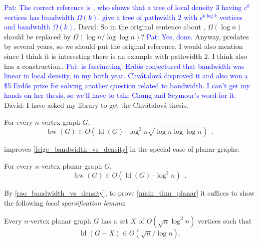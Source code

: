 \documentclass{patmorin}
\newcommand{\david}[1]{{\color{orange} David: #1}}
\newcommand{\pat}[1]{\textcolor{Blue}{Pat: #1}}
\newcommand{\defin}[1]{\emph{\textcolor{brightmaroon}{#1}}}
\DeclareMathOperator{\bw}{bw}
\DeclareMathOperator{\ld}{ld}
\begin{document}
\pat{The correct reference is \citet{chvatalova:on}, who shows that a tree of local density $3$ having $c^k$ vertices has bandwidth $\Omega(k)$.  \citet{CS89} give a tree of pathwidth $2$ with $c^{k\log k}$ vertices and bandwidth $\Omega(k)$.} \david{So in the original sentence about \cite{CS89}, $\Omega(\log n)$ should be replaced by $\Omega(\log n/ \log\log n)$? \pat{Yes, done.} Anyway,
\citet{chvatalova:on} predates \citep{CS89} by several years, so we should put the original reference. I would also mention \citet{CS89} since I think it is interesting there is an example with pathwidth 2. I think \citet{CCDG82} also has a construction.}. \pat{\citet{CCDG82} is fascinating.  Erd\"os conjectured that bandwidth was linear in local density, in my birth year. Chvátalová disproved it and also won a \$5 Erd\H{o}s prize for solving another question related to bandwidth.  I can't get my hands on her thesis, so we'll have to take Chung and Seymour's word for it.} \david{I have asked my library to get the  Chvátalová  thesis.}

\begin{thm}
\label{feige_bandwidth_vs_density}
  For every $n$-vertex graph $G$,
  \[
    \bw(G)\in O\left(\ld(G)\cdot \log^3 n\sqrt{\log n\log\log n}\right) \enspace .
  \]
\end{thm}

\citet{rao:small} improves \cref{feige_bandwidth_vs_density} in the special case of planar graphs:%

\begin{thm}
\label{rao_bandwidth_vs_density}
  For every $n$-vertex planar graph $G$,
  \[
    \bw(G)\in O\left(\ld(G)\cdot \log^3 n\right) \enspace .
  \]
\end{thm}

By \cref{rao_bandwidth_vs_density}, to prove \cref{main_thm_planar} it suffices to show the following \defin{local sparsification lemma}:

\begin{lem}\label{planar_sparsification_special}
  Every $n$-vertex planar graph $G$ has a set $X$ of $O(\sqrt{n}\log^2 n)$ vertices such that
  $$\ld(G-X)\in O(\sqrt{n}/\log n).$$
\end{lem}

\end{document}
